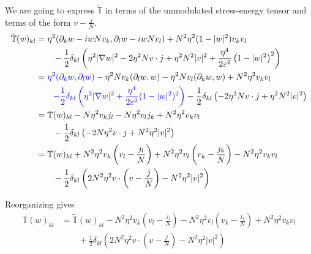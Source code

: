 \documentclass[a4paper]{article}
\begin{document}
We are going to express $\tilde{\mathbb{T}}$ in terms of the unmodulated stress-energy tensor and terms of the form $v-\frac{j}{N}$.
\begin{align}
  \tilde{\mathbb{T}}(w)_{kl} &= \eta^2 ( \partial_k w - i w N v_k, \partial_l w - i w N v_l) + N^2 \eta^2 (1-|w|^2) v_k v_l \nonumber \\
  &\quad \quad - \frac{1}{2} \delta_{kl} \left( \eta^2 | \nabla w |^2 - 2 \eta^2 N v \cdot j + \eta^2 N^2 |v|^2 + \frac{\eta^4}{2\varepsilon^2} \left(
  1-|w|^2 \right)^2 \right) \nonumber \\
  &= { \color{blue} \eta^2 (\partial_k w, \partial_l w) } - \eta^2 N v_k (\partial_l w, w ) - \eta^2 N v_l (\partial_k w, w) + N^2 \eta^2 v_k v_l
  \nonumber \\
  &\quad \quad { \color{blue} - \frac{1}{2} \delta_{kl} \left( \eta^2 |\nabla w|^2 + \frac{\eta^4}{2 \varepsilon^2} (1-|w|^2)^2 \right) }
  -\frac{1}{2} \delta_{kl} \left( - 2 \eta^2 N v \cdot j + \eta^2 N^2 |v|^2 \right) \nonumber \\
  &= \mathbb{T}(w)_{kl} - N \eta^2 v_k j_l - N \eta^2 v_l j_k + N^2 \eta^2 v_k v_l \nonumber \\
  &\quad \quad - \frac{1}{2} \delta_{kl} \left( - 2 N \eta^2 v \cdot j + N^2 \eta^2 |v|^2 \right) \nonumber \\
  &= \mathbb{T}(w)_{kl} + N^2 \eta^2 v_k \left( v_l - \frac{j_l}{N} \right) + N^2 \eta^2 v_l \left( v_k - \frac{j_k}{N} \right) - N^2 \eta^2 v_k v_l
  \nonumber \\
  &\quad \quad - \frac{1}{2} \delta_{kl} \left( 2 N^2 \eta^2 v \cdot \left( v - \frac{j}{N} \right) - N^2 \eta^2 |v|^2 \right)
  \label{eq:mod_stress_energy}
\end{align}

Reorganizing gives
\begin{align}
  \mathbb{T}(w)_{kl} &= \tilde{\mathbb{T}}(w)_{kl} - N^2 \eta^2 v_k \left( v_l - \frac{j_l}{N} \right) - N^2 \eta^2 v_l \left( v_k -
  \frac{j_k}{N} \right) + N^2 \eta^2 v_k v_l \nonumber \\
  &\quad \quad + \frac{1}{2} \delta_{kl} \left( 2 N^2 \eta^2 v \cdot \left( v - \frac{j}{N} \right) - N^2 \eta^2 |v|^2 \right)
  \label{eq:stress-energy}
\end{align}
\end{document}
